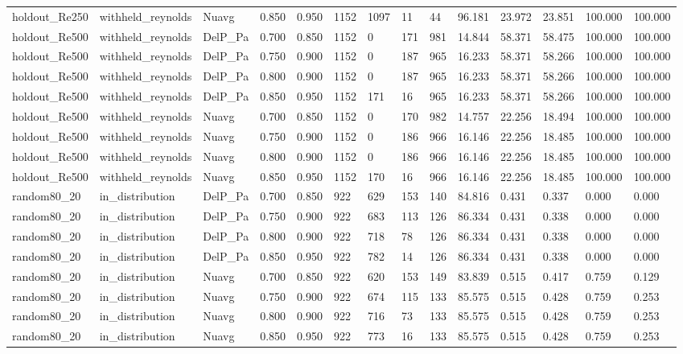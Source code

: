 \begin{tabular}{llllllllllllll}
holdout_Re250 & withheld_reynolds & Nuavg & 0.850 & 0.950 & 1152 & 1097 & 11 & 44 & 96.181 & 23.972 & 23.851 & 100.000 & 100.000 \\
holdout_Re500 & withheld_reynolds & DelP_Pa & 0.700 & 0.850 & 1152 & 0 & 171 & 981 & 14.844 & 58.371 & 58.475 & 100.000 & 100.000 \\
holdout_Re500 & withheld_reynolds & DelP_Pa & 0.750 & 0.900 & 1152 & 0 & 187 & 965 & 16.233 & 58.371 & 58.266 & 100.000 & 100.000 \\
holdout_Re500 & withheld_reynolds & DelP_Pa & 0.800 & 0.900 & 1152 & 0 & 187 & 965 & 16.233 & 58.371 & 58.266 & 100.000 & 100.000 \\
holdout_Re500 & withheld_reynolds & DelP_Pa & 0.850 & 0.950 & 1152 & 171 & 16 & 965 & 16.233 & 58.371 & 58.266 & 100.000 & 100.000 \\
holdout_Re500 & withheld_reynolds & Nuavg & 0.700 & 0.850 & 1152 & 0 & 170 & 982 & 14.757 & 22.256 & 18.494 & 100.000 & 100.000 \\
holdout_Re500 & withheld_reynolds & Nuavg & 0.750 & 0.900 & 1152 & 0 & 186 & 966 & 16.146 & 22.256 & 18.485 & 100.000 & 100.000 \\
holdout_Re500 & withheld_reynolds & Nuavg & 0.800 & 0.900 & 1152 & 0 & 186 & 966 & 16.146 & 22.256 & 18.485 & 100.000 & 100.000 \\
holdout_Re500 & withheld_reynolds & Nuavg & 0.850 & 0.950 & 1152 & 170 & 16 & 966 & 16.146 & 22.256 & 18.485 & 100.000 & 100.000 \\
random80_20 & in_distribution & DelP_Pa & 0.700 & 0.850 & 922 & 629 & 153 & 140 & 84.816 & 0.431 & 0.337 & 0.000 & 0.000 \\
random80_20 & in_distribution & DelP_Pa & 0.750 & 0.900 & 922 & 683 & 113 & 126 & 86.334 & 0.431 & 0.338 & 0.000 & 0.000 \\
random80_20 & in_distribution & DelP_Pa & 0.800 & 0.900 & 922 & 718 & 78 & 126 & 86.334 & 0.431 & 0.338 & 0.000 & 0.000 \\
random80_20 & in_distribution & DelP_Pa & 0.850 & 0.950 & 922 & 782 & 14 & 126 & 86.334 & 0.431 & 0.338 & 0.000 & 0.000 \\
random80_20 & in_distribution & Nuavg & 0.700 & 0.850 & 922 & 620 & 153 & 149 & 83.839 & 0.515 & 0.417 & 0.759 & 0.129 \\
random80_20 & in_distribution & Nuavg & 0.750 & 0.900 & 922 & 674 & 115 & 133 & 85.575 & 0.515 & 0.428 & 0.759 & 0.253 \\
random80_20 & in_distribution & Nuavg & 0.800 & 0.900 & 922 & 716 & 73 & 133 & 85.575 & 0.515 & 0.428 & 0.759 & 0.253 \\
random80_20 & in_distribution & Nuavg & 0.850 & 0.950 & 922 & 773 & 16 & 133 & 85.575 & 0.515 & 0.428 & 0.759 & 0.253 \\
\hline
\end{tabular}
